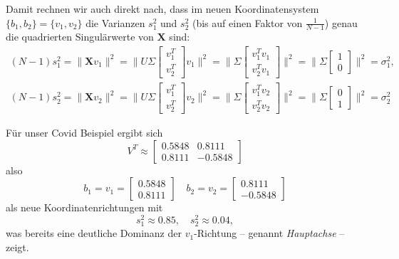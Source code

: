 \documentclass[
]{book}
\theoremstyle{definition}
\theoremstyle{definition}
\theoremstyle{definition}
\theoremstyle{definition}
\theoremstyle{remark}
\begin{document}
Damit rechnen wir auch direkt nach, dass im neuen Koordinatensystem \(\{b_1, b_2\}=\{v_1, v_2\}\) die Varianzen \(s_1^2\) und \(s_2^2\) (bis auf einen Faktor von \(\frac{1}{N-1}\)) genau die quadrierten Singulärwerte von \(\mathbf X\) sind:
\begin{align*}
(N-1)s_1^2 
= \|\mathbf X v_1 \|^2 = \|U \Sigma \begin{bmatrix} v_1^T \\ v_2^T \end{bmatrix}v_1\|^2
= \|\Sigma \begin{bmatrix} v_1^Tv_1 \\ v_2^T v_1\end{bmatrix}\|^2
=  \|\Sigma \begin{bmatrix} 1 \\  0\end{bmatrix}\|^2
=\sigma_1^2,\\
(N-1)s_2^2 
= \|\mathbf X v_2 \|^2 = \|U \Sigma \begin{bmatrix} v_1^T \\ v_2^T \end{bmatrix}v_2\|^2
= \|\Sigma \begin{bmatrix} v_1^Tv_2 \\ v_2^T v_2\end{bmatrix}\|^2
=  \|\Sigma \begin{bmatrix} 0 \\  1\end{bmatrix}\|^2
=\sigma_2^2
\end{align*}

Für unser Covid Beispiel ergibt sich
\begin{equation*}
V^T \approx
\begin{bmatrix}
0.5848 &  0.8111 \\
0.8111 & -0.5848
\end{bmatrix}
\end{equation*}
also
\begin{equation*}
b_1 = v_1 = \begin{bmatrix}
0.5848 \\  0.8111 
\end{bmatrix}
\quad
b_2 = v_2 = \begin{bmatrix}
0.8111 \\ -0.5848
\end{bmatrix}
\end{equation*}
als neue Koordinatenrichtungen mit
\begin{equation*}
s_1^2 \approx 0.85, \quad s_2^2 \approx 0.04,
\end{equation*}
was bereits eine deutliche Dominanz der \(v_1\)-Richtung -- genannt \emph{Hauptachse} -- zeigt.
\end{document}
